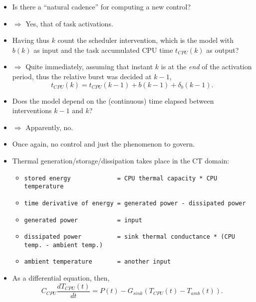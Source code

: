 \begin{frame}
\myPause
 \begin{itemize}[<+-| alert@+>]
 \item Is there a ``natural cadence'' for computing a new control? 
 \item[] $\Rightarrow$ Yes, that of task activations.
 \item Having thus $k$ count the scheduler intervention, which is the model with $b(k)$ as input 
       and the task accumulated CPU time $t_{CPU}(k)$ as output?
 \item[] $\Rightarrow$ Quite immediately, assuming that instant $k$ is at the \emph{end} of the activation\\
       \hspace{5.5mm}period, thus the relative burst was decided at $k-1$,
       \begin{displaymath}
        t_{CPU}(k) = t_{CPU}(k-1)+b(k-1)+\delta_b(k-1).
       \end{displaymath}
 \item Does the model depend on the (continuous) time elapsed between\\
       interventions $k-1$ and $k$?
 \item[] $\Rightarrow$ Apparently, no.    
 \end{itemize}
\end{frame}

\begin{frame}[fragile]
\myPause
 \begin{itemize}[<+-| alert@+>]
 \item Once again, no control and just the phenomenon to govern.
 \item Thermal generation/storage/dissipation takes place in the CT domain:
       \begin{itemize}[<+-| alert@+>]
       \item {\scriptsize\verb#stored energy             = CPU thermal capacity * CPU temperature#}
       \item {\scriptsize\verb#time derivative of energy = generated power - dissipated power#}
       \item {\scriptsize\verb#generated power           = input#}
       \item {\scriptsize\verb#dissipated power          = sink thermal conductance * (CPU temp. - ambient temp.)#}
       \item {\scriptsize\verb#ambient temperature       = another input#}
       \end{itemize}
 \item As a differential equation, then,
       \begin{displaymath}
        C_{CPU} \frac{dT_{CPU}(t)}{dt} = P(t) - G_{sink}(T_{CPU}(t)-T_{amb}(t)).
       \end{displaymath}
 \end{itemize}
\end{frame}

